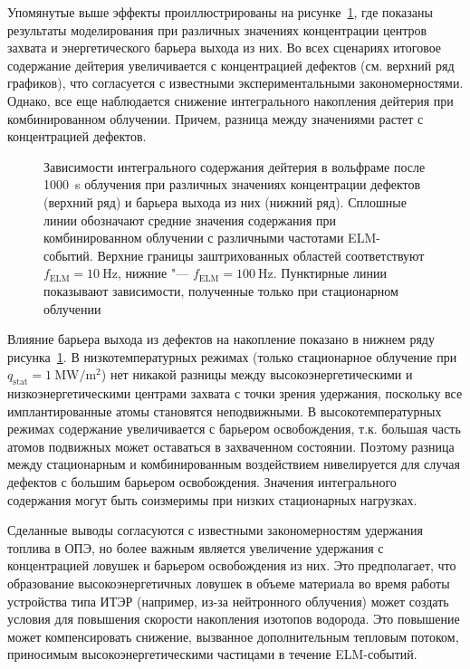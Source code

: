 Упомянутые выше эффекты проиллюстрированы на рисунке~\cref{fig:ch3/eta_Edt_var}, где показаны результаты моделирования при различных значениях концентрации центров захвата и энергетического барьера выхода из них. Во всех сценариях итоговое содержание дейтерия увеличивается с концентрацией дефектов (см. верхний ряд графиков), что согласуется с известными экспериментальными закономерностями. Однако, все еще наблюдается снижение интегрального накопления дейтерия при комбинированном облучении. Причем, разница между значениями растет с концентрацией дефектов.
\begin{figure}[ht]
	\caption{Зависимости интегрального содержания дейтерия в вольфраме после \SI{1000}{\second} облучения при различных значениях концентрации дефектов (верхний ряд) и барьера выхода из них (нижний ряд). Сплошные линии обозначают средние значения содержания при комбинированном облучении с различными частотами ELM-событий. Верхние границы заштрихованных областей соответствуют \(f_\mathrm{ELM} = \SI{10}{\hertz}\), нижние "--- \(f_\mathrm{ELM} = \SI{100}{\hertz}\). Пунктирные линии показывают зависимости, полученные только при стационарном облучении}\label{fig:ch3/eta_Edt_var}
\end{figure}

Влияние барьера выхода из дефектов на накопление показано в нижнем ряду рисунка~\cref{fig:ch3/eta_Edt_var}. В низкотемпературных режимах (только стационарное облучение при $q_{\mathrm{stat}}=\SI{1}{\mega\watt\per\meter\squared}$) нет никакой разницы между высокоэнергетическими и низкоэнергетическими центрами захвата с точки зрения удержания, поскольку все имплантированные атомы становятся неподвижными. В высокотемпературных режимах содержание увеличивается с барьером освобождения, т.к. большая часть атомов подвижных может оставаться в захваченном состоянии. Поэтому разница между стационарным и комбинированным воздействием нивелируется для случая дефектов с большим барьером освобождения. Значения интегрального содержания могут быть соизмеримы при низких стационарных нагрузках.

Сделанные выводы согласуются с известными закономерностям удержания топлива в ОПЭ, но более важным является увеличение удержания с концентрацией ловушек и барьером освобождения из них. Это предполагает, что образование высокоэнергетичных ловушек в объеме материала во время работы устройства типа ИТЭР (например, из-за нейтронного облучения) может создать условия для повышения скорости накопления изотопов водорода. Это повышение может компенсировать снижение, вызванное дополнительным тепловым потоком, приносимым высокоэнергетическими частицами в течение ELM-событий.

